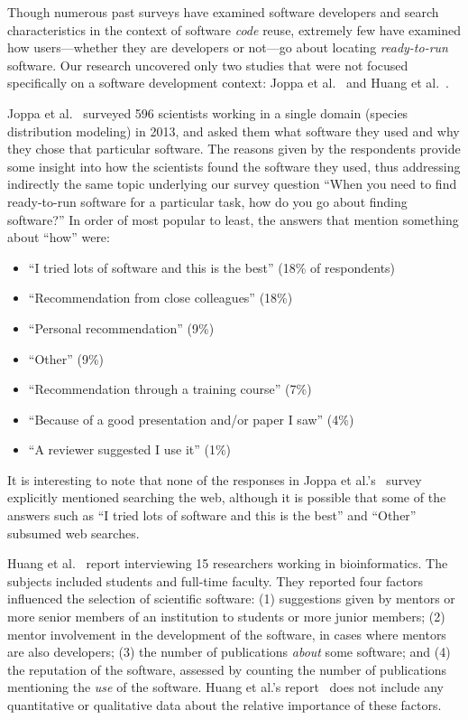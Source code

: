 \documentclass{casicswhitepaper}
\begin{document}
Though numerous past surveys have examined software developers and search characteristics in the context of software \emph{code} reuse, extremely few have examined how users---whether they are developers or not---go about locating \emph{ready-to-run} software.  Our research uncovered only two studies that were not focused specifically on a software development context: Joppa et al.~\cite{joppa2013troubling} and Huang et al.~\cite{huang2013provenance}.

Joppa et al.~\cite{joppa2013troubling} surveyed 596 scientists working in a single domain (species distribution modeling) in 2013, and asked them what software they used and why they chose that particular software.  The reasons given by the respondents provide some insight into how the scientists found the software they used, thus addressing indirectly the same topic underlying our survey question ``When you need to find ready-to-run software for a particular task, how do you go about finding software?''  In order of most popular to least, the answers that mention something about ``how'' were:
\begin{itemize}

\item ``I tried lots of software and this is the best'' (18\% of respondents)
\item ``Recommendation from close colleagues'' (18\%)
\item ``Personal recommendation'' (9\%)
\item ``Other'' (9\%)
\item ``Recommendation through a training course'' (7\%)
\item ``Because of a good presentation and/or paper I saw'' (4\%)
\item ``A reviewer suggested I use it'' (1\%)

\end{itemize}

It is interesting to note that none of the responses in Joppa et al.'s~\cite{joppa2013troubling} survey explicitly mentioned searching the web, although it is possible that some of the answers such as ``I tried lots of software and this is the best'' and ``Other'' subsumed web searches.

Huang et al.~\cite{huang2013provenance} report interviewing 15 researchers working in bioinformatics.  The subjects included students and full-time faculty.  They reported four factors influenced the selection of scientific software: (1) suggestions given by mentors or more senior members of an institution to students or more junior members; (2) mentor involvement in the development of the software, in cases where mentors are also developers; (3) the number of publications \emph{about} some software; and (4) the reputation of the software, assessed by counting the number of publications mentioning the \emph{use} of the software.  Huang et al.'s report~\cite{huang2013provenance} does not include any quantitative or qualitative data about the relative importance of these factors.
\end{document}
